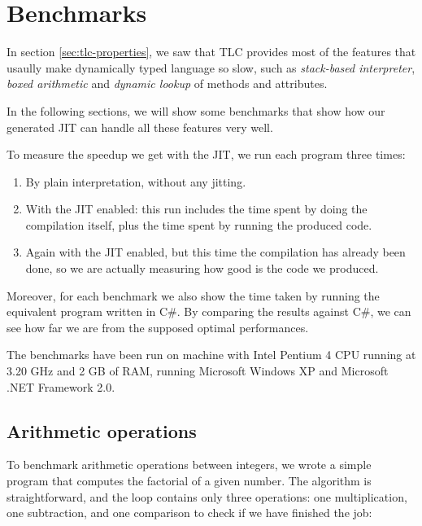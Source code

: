 \section{Benchmarks}


In section \ref{sec:tlc-properties}, we saw that TLC provides most of the
features that usaully make dynamically typed language so slow, such as
\emph{stack-based interpreter}, \emph{boxed arithmetic} and \emph{dynamic lookup} of
methods and attributes.

In the following sections, we will show some benchmarks that show how our
generated JIT can handle all these features very well.

To measure the speedup we get with the JIT, we run each program three times:

\begin{enumerate}
\item By plain interpretation, without any jitting.
\item With the JIT enabled: this run includes the time spent by doing the
  compilation itself, plus the time spent by running the produced code.
\item Again with the JIT enabled, but this time the compilation has already
  been done, so we are actually measuring how good is the code we produced.
\end{enumerate}

Moreover, for each benchmark we also show the time taken by running the
equivalent program written in C\#.  By comparing the results against C\#, we
can see how far we are from the supposed optimal performances.  

The benchmarks have been run on machine with Intel Pentium 4 CPU running at
3.20 GHz and 2 GB of RAM, running Microsoft Windows XP and Microsoft .NET
Framework 2.0.

\subsection{Arithmetic operations}

To benchmark arithmetic operations between integers, we wrote a simple program
that computes the factorial of a given number.  The algorithm is
straightforward, and the loop contains only three operations: one
multiplication, one subtraction, and one comparison to check if we have
finished the job:

